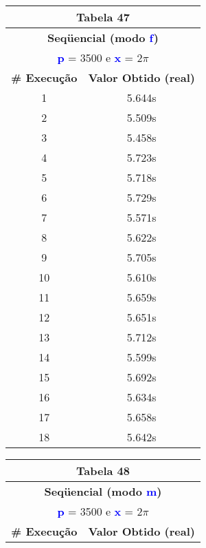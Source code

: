 \documentclass[11pt]{article}
\begin{document}
\begin{table}[!h]
	\begin{center}
		\begin{minipage}{0.48\textwidth}
			\begin{tabular}{| c | c |}
			\hline
			\multicolumn{2}{|c|}{\textbf{Tabela 47}} \\ \hline
			\multicolumn{2}{|c|}{\textbf{Seqüencial (modo \textbf{\textcolor{blue}{f}})}} \\
			\multicolumn{2}{|c|}{\textbf{\textcolor{blue}{p}} = 3500 e \textbf{\textcolor{blue}{x}} = $2\pi$} \\ [0.2ex]
			\hline
				\textbf{\# Execução} &  \textbf{Valor Obtido (real)} \\ \hline
				1 & 5.644s \\ \hline
				2 & 5.509s \\ \hline
				3 & 5.458s \\ \hline
				4 & 5.723s \\ \hline
				5 & 5.718s \\ \hline
				6 & 5.729s \\ \hline
				7 & 5.571s \\ \hline
				8 & 5.622s \\ \hline
				9 & 5.705s \\ \hline
				10 & 5.610s \\ \hline
				11 & 5.659s \\ \hline
				12 & 5.651s \\ \hline
				13 & 5.712s \\ \hline
				14 & 5.599s \\ \hline
				15 & 5.692s \\ \hline
				16 & 5.634s \\ \hline
				17 & 5.658s \\ \hline
				18 & 5.642s \\ \hline
			\end{tabular}
		\end{minipage}
		\begin{minipage}{0.48\textwidth}
			\begin{tabular}{| c | c |}
			\hline
			\multicolumn{2}{|c|}{\textbf{Tabela 48}} \\ \hline
			\multicolumn{2}{|c|}{\textbf{Seqüencial (modo \textbf{\textcolor{blue}{m}})}} \\
			\multicolumn{2}{|c|}{\textbf{\textcolor{blue}{p}} = 3500 e \textbf{\textcolor{blue}{x}} = $2\pi$} \\ [0.2ex]
			\hline
				\textbf{\# Execução} &  \textbf{Valor Obtido (real)} \\ \hline

\end{tabular}
\end{minipage}
\end{center}
\end{table}
\end{document}
